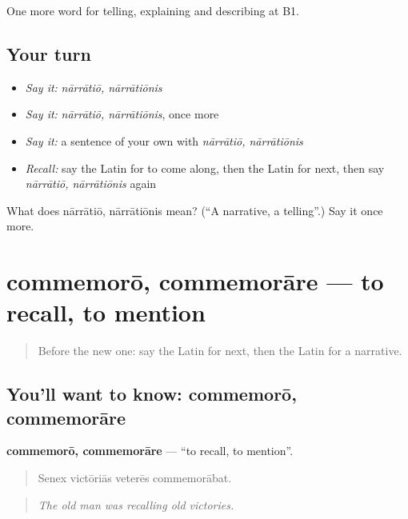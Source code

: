 \begin{grammarlens}[title={What you've built}]
One more word for telling, explaining and describing at B1.
\end{grammarlens}

\subsection*{Your turn}
\begin{itemize}
\raggedright
  \item \emph{Say it:} \emph{nārrātiō, nārrātiōnis}
  \item \emph{Say it:} \emph{nārrātiō, nārrātiōnis}, once more
  \item \emph{Say it:} a sentence of your own with \emph{nārrātiō, nārrātiōnis}
  \item \emph{Recall:} say the Latin for to come along, then the Latin for next, then say \emph{nārrātiō, nārrātiōnis} again
\end{itemize}

\begin{tcolorbox}[breakable,colback=teal!4,colframe=teal!35!black,title={Before you move on}]
What does nārrātiō, nārrātiōnis mean? (\textquotedblleft{}A narrative, a telling\textquotedblright{}.) Say it once more.
\end{tcolorbox}
\section[commemorō, commemorāre]{commemorō, commemorāre — to recall, to mention}

\label{lesson:LA-C299-commemoro}



\begin{quote}
Before the new one: say the Latin for next, then the Latin for a narrative.
\end{quote}

\subsection*{You'll want to know: commemorō, commemorāre}
\textbf{commemorō, commemorāre} — \textquotedblleft{}to recall, to mention\textquotedblright{}.

\begin{quote}
Senex victōriās veterēs commemorābat.
\end{quote}

\begin{quote}
\emph{The old man was recalling old victories.}
\end{quote}

